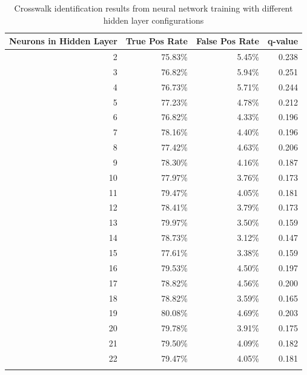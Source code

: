 \documentclass[12pt]{ucthesis}
\begin{document}
    \begin{longtable}{|r|r|r|r|}
    \hline
    Neurons in Hidden Layer & True Pos Rate & False Pos Rate & q-value \bigstrut\\
    \hline
    2     & 75.83\% & 5.45\% & 0.238 \bigstrut\\
    \hline
    3     & 76.82\% & 5.94\% & 0.251 \bigstrut\\
    \hline
    4     & 76.73\% & 5.71\% & 0.244 \bigstrut\\
    \hline
    5     & 77.23\% & 4.78\% & 0.212 \bigstrut\\
    \hline
    6     & 76.82\% & 4.33\% & 0.196 \bigstrut\\
    \hline
    7     & 78.16\% & 4.40\% & 0.196 \bigstrut\\
    \hline
    8     & 77.42\% & 4.63\% & 0.206 \bigstrut\\
    \hline
    9     & 78.30\% & 4.16\% & 0.187 \bigstrut\\
    \hline
    10    & 77.97\% & 3.76\% & 0.173 \bigstrut\\
    \hline
    11    & 79.47\% & 4.05\% & 0.181 \bigstrut\\
    \hline
    12    & 78.41\% & 3.79\% & 0.173 \bigstrut\\
    \hline
    13    & 79.97\% & 3.50\% & 0.159 \bigstrut\\
    \hline
    14    & 78.73\% & 3.12\% & 0.147 \bigstrut\\
    \hline
    15    & 77.61\% & 3.38\% & 0.159 \bigstrut\\
    \hline
    16    & 79.53\% & 4.50\% & 0.197 \bigstrut\\
    \hline
    17    & 78.82\% & 4.56\% & 0.200 \bigstrut\\
    \hline
    18    & 78.82\% & 3.59\% & 0.165 \bigstrut\\
    \hline
    19    & 80.08\% & 4.69\% & 0.203 \bigstrut\\
    \hline
    20    & 79.78\% & 3.91\% & 0.175 \bigstrut\\
    \hline
    21    & 79.50\% & 4.09\% & 0.182 \bigstrut\\
    \hline
    22    & 79.47\% & 4.05\% & 0.181 \bigstrut\\
    \hline

    \caption{Crosswalk identification results from neural network training with different hidden layer configurations}
    \label{tab:NN-HiddenLayersResultsAPP} 
    \end{longtable}
\end{document}
